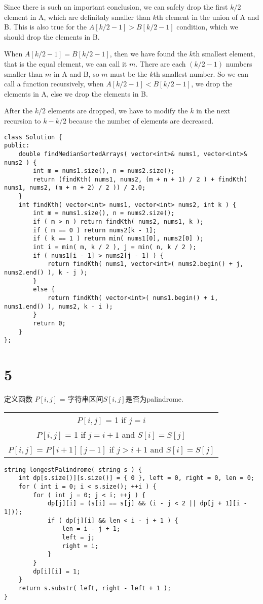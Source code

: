 \documentclass[12pt,a4paper]{article}
\begin{document}
\par
Since there is such an important conclusion, we can safely drop the first $k/2$ element in A, which are definitaly smaller than $k$th element in the union of A and B. This is also true for the $A[k/2-1] > B[k/2-1]$ condition, which we should drop the elements in B.
\par
When $A[k/2-1] = B[k/2-1]$, then we have found the $k$th smallest element, that is the equal element, we can call it $m$. There are each $(k/2-1)$ numbers smaller than $m$ in A and B, so $m$ must be the $k$th smallest number. So we can call a function recursively, when $A[k/2-1] < B[k/2-1]$, we drop the elements in A, else we drop the elements in B.
\par
After the $k/2$ elements are dropped, we have to modify the $k$ in the next recursion to $k-k/2$ because the number of elements are decreased.
\begin{lstlisting}
class Solution {
public:
	double findMedianSortedArrays( vector<int>& nums1, vector<int>& nums2 ) {
		int m = nums1.size(), n = nums2.size();
		return (findKth( nums1, nums2, (m + n + 1) / 2 ) + findKth( nums1, nums2, (m + n + 2) / 2 )) / 2.0;
	}
	int findKth( vector<int> nums1, vector<int> nums2, int k ) {
		int m = nums1.size(), n = nums2.size();
		if ( m > n ) return findKth( nums2, nums1, k );
		if ( m == 0 ) return nums2[k - 1];
		if ( k == 1 ) return min( nums1[0], nums2[0] );
		int i = min( m, k / 2 ), j = min( n, k / 2 );
		if ( nums1[i - 1] > nums2[j - 1] ) {
			return findKth( nums1, vector<int>( nums2.begin() + j, nums2.end() ), k - j );
		}
		else {
			return findKth( vector<int>( nums1.begin() + i, nums1.end() ), nums2, k - i );
		}
		return 0;
	}
};
\end{lstlisting}


\section{5}
\begin{CJK}{UTF8}{gbsn}
定义函数
$P[i,j]$ = 字符串区间$S[i,j]$是否为palindrome.
\end{CJK}
\begin{center}
\begin{tabular}{c}
$P[i,j]$ = 1 if $j=i$\\
$P[i,j]$ = 1 if $j=i+1$ and $S[i]=S[j]$ \\
$P[i,j]$ = $P[i+1][j-1]$ if $j > i+1$ and $S[i]=S[j]$ \\
\end{tabular}
\end{center}
\begin{lstlisting}
string longestPalindrome( string s ) {
	int dp[s.size()][s.size()] = { 0 }, left = 0, right = 0, len = 0;
	for ( int i = 0; i < s.size(); ++i ) {
		for ( int j = 0; j < i; ++j ) {
			dp[j][i] = (s[i] == s[j] && (i - j < 2 || dp[j + 1][i - 1]));
			if ( dp[j][i] && len < i - j + 1 ) {
				len = i - j + 1;
				left = j;
				right = i;
			}
		}
		dp[i][i] = 1;
	}
	return s.substr( left, right - left + 1 );
}
\end{lstlisting}
\end{document}
